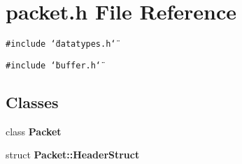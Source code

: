 \section{packet.h File Reference}
\label{packet_8h}
{\tt \#include \char`\"{}datatypes.h\char`\"{}}\par
{\tt \#include \char`\"{}buffer.h\char`\"{}}\par
\subsection*{Classes}
\begin{CompactItemize}
\item 
class {\bf Packet}
\item 
struct {\bf Packet::Header\-Struct}
\end{CompactItemize}
